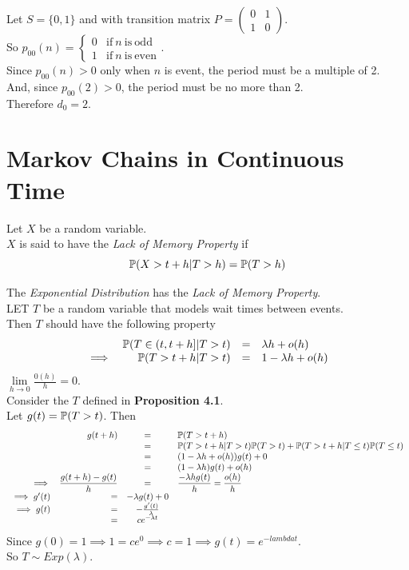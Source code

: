 \documentclass[11pt,a4paper]{article}
\begin{document}
Let $S=\{0,1\}$ and with transition matrix $P=\begin{pmatrix}0&1\\1&0\end{pmatrix}$.\\
So $p_{00}(n)=\begin{cases}0&\mathrm{if\ }n\mathrm{\ is\ odd}\\1&\mathrm{if\ }n\mathrm{\ is\ even}\end{cases}$.\\
Since $p_{00}(n)>0$ only when $n$ is event, the period must be a multiple of 2.\\
And, since $p_{00}(2)>0$, the period must be no more than 2.\\
Therefore $d_0=2$.\\

\section{Markov Chains in Continuous Time}

Let $X$ be a random variable.\\
$X$ is said to have the \textit{Lack of Memory Property} if
$$\mathbb{P}(X>t+h|T>h)=\mathbb{P}(T>h)$$

The \textit{Exponential Distribution} has the \textit{Lack of Memory Property}.\\

LET $T$ be a random variable that models wait times between events.\\
Then $T$ should have the following property
\[\begin{array}{rrcl}
&\mathbb{P}(T\in(t,t+h]|T>t)&=&\lambda h+o(h)\\
\implies&\mathbb{P}(T>t+h|T>t)&=&1-\lambda h+o(h)
\end{array}\]
\nb $\lim\limits_{h\to0}\frac{0(h)}{h}=0$.\\

Consider the $T$ defined in \textbf{Proposition 4.1}.\\
Let $g(t)=\mathbb{P}(T>t)$. Then
\[\begin{array}{rrcl}
&g(t+h)&=&\mathbb{P}(T>t+h)\\
&&=&\mathbb{P}(T>t+h|T>t)\mathbb{P}(T>t)+\mathbb{P}(T>t+h|T\leq t)\mathbb{P}(T\leq t)\\
&&=&(1-\lambda h+o(h))g(t)+0\\
&&=&(1-\lambda h)g(t)+o(h)\\
\implies&\dfrac{g(t+h)-g(t)}{h}&=&\dfrac{-\lambda hg(t)}{h}=\dfrac{o(h)}{h}\\
\implies g'(t)&=&-\lambda g(t)+0\\
\implies g(t)&=&-\frac{g'(t)}{\lambda}\\
&=&ce^{-\lambda t}
\end{array}\]
Since $g(0)=1\implies1=ce^0\implies c=1\implies g(t)=e^{-lambda t}$.\\
So $T\sim Exp(\lambda)$.\\
\end{document}
